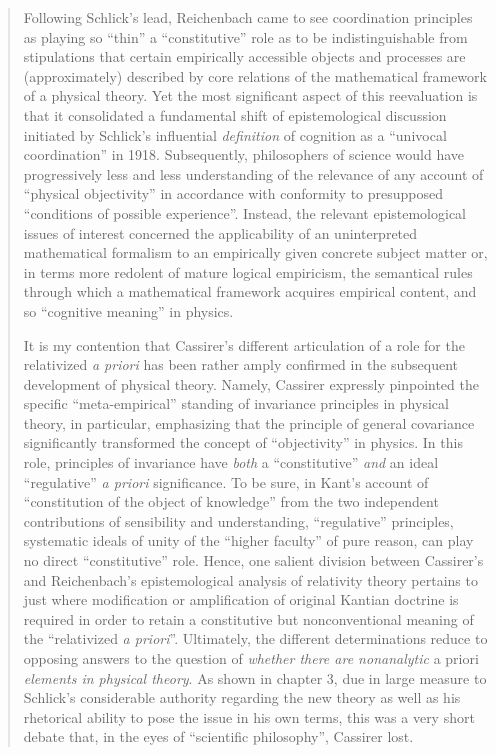 \begin{quote}
    Following Schlick's lead, Reichenbach came to see coordination principles as playing so ``thin'' a ``constitutive'' role as to be indistinguishable from stipulations that certain empirically accessible objects and processes are (approximately) described by core relations of the mathematical framework of a physical theory.  Yet the most significant aspect of this reevaluation is that it consolidated a fundamental shift of epistemological discussion initiated by Schlick's influential \emph{definition} of cognition as a ``univocal coordination'' in 1918.  Subsequently, philosophers of science would have progressively less and less understanding of the relevance of any account of ``physical objectivity'' in accordance with conformity to presupposed ``conditions of possible experience''.  Instead, the relevant epistemological issues of interest concerned the applicability of an uninterpreted mathematical formalism to an empirically given concrete subject matter or, in terms more redolent of mature logical empiricism, the semantical rules through which a mathematical framework acquires empirical content, and so ``cognitive meaning'' in physics.  
    
    It is my contention that Cassirer's different articulation of a role for the relativized \emph{a priori} has been rather amply confirmed in the subsequent development of physical theory.  Namely, Cassirer expressly pinpointed the specific ``meta-empirical'' standing of invariance principles in physical theory, in particular, emphasizing that the principle of general covariance significantly transformed the concept of ``objectivity'' in physics.  In this role, principles of invariance have \emph{both} a ``constitutive'' \emph{and} an ideal ``regulative'' \emph{a priori} significance.  To be sure, in Kant's account of ``constitution of the object of knowledge'' from the two independent contributions of sensibility and understanding, ``regulative'' principles, systematic ideals of unity of the ``higher faculty'' of pure reason, can play no direct ``constitutive'' role.  Hence, one salient division between Cassirer's and Reichenbach's epistemological analysis of relativity theory pertains to just where modification or amplification of original Kantian doctrine is required in order to retain a constitutive but nonconventional meaning of the ``relativized \emph{a priori}''.  Ultimately, the different determinations reduce to opposing answers to the question of \emph{whether there are nonanalytic} a priori \emph{elements in physical theory}.  As shown in chapter 3, due in large measure to Schlick's considerable authority regarding the new theory as well as his rhetorical ability to pose the issue in his own terms, this was a very short debate that, in the eyes of ``scientific philosophy'', Cassirer lost.
    

\end{quote}
